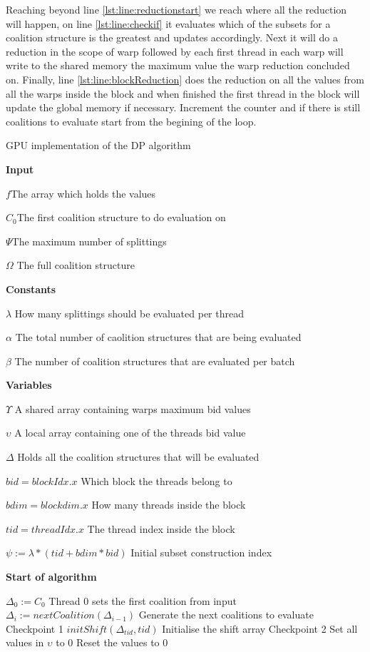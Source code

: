 \documentclass{llncs}
\begin{document}
Reaching beyond line \ref{lst:line:reductionstart} we reach where all the reduction will happen, 
on line \ref{lst:line:checkif} it evaluates which of the subsets for a coalition structure is the greatest and updates accordingly.
Next it will do a reduction in the scope of warp followed by each first thread in each warp will write to the shared memory 
the maximum value the warp reduction concluded on. Finally, line \ref{lst:line:blockReduction} does the reduction on all the values
from all the warps inside the block and when finished the first thread in the block will update the global memory if necessary.
Increment the counter and if there is still coalitions to evaluate start from the begining of the loop.
\begin{algorithm}[!h]
\caption{GPU implementation of the DP algorithm\label{gpudp}}
\textbf{Input}

$f$\hfill The array which holds the values

$C_0$\hfill The first coalition structure to do evaluation on

$\Psi$\hfill The maximum number of splittings

$\Omega$ \hfill The full coalition structure

\textbf{Constants}

$\lambda$ \hfill How many splittings should be evaluated per thread

$\alpha$ \hfill The total number of caolition structures that are being evaluated

$\beta$ \hfill The number of coalition structures that are evaluated per batch

\textbf{Variables} 

$\Upsilon$ \hfill A shared array containing warps maximum bid values

$\upsilon$ \hfill A local array containing one of the threads bid value

$\Delta$ \hfill Holds all the coalition structures that will be evaluated

$bid = blockIdx.x$ \hfill Which block the threads belong to



$bdim = blockdim.x$ \hfill How many threads inside the block

$tid = threadIdx.x$ \hfill The thread index inside the block

$\psi := \lambda*(tid+bdim*bid)$ \hfill Initial subset construction index

\textbf{Start of algorithm}
\begin{algorithmic}[1]
  \STATE $\Delta_0 := C_0$ \hfill Thread 0 sets the first coalition from input
    \STATE $\Delta_i := nextCoalition(\Delta_{i-1})$ \hfill Generate the next coalitions to evaluate
  \ENDFOR \hfill Checkpoint 1
\ENDIF
{}
  \STATE $initShift(\Delta_{tid},tid)$ \hfill Initialise the shift array
\ENDIF
\hfill Checkpoint 2
\label{lst:line:bigfetch}
  \STATE Set all values in $\upsilon$ to 0 \hfill Reset the values to 0


\end{algorithmic}
\end{algorithm}
\end{document}
